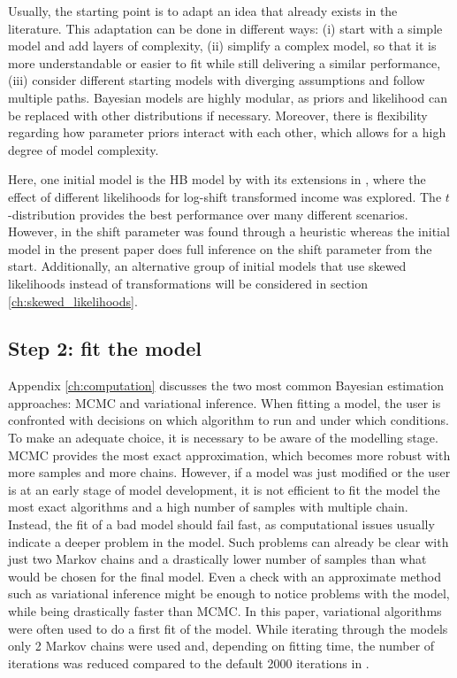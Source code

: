 Usually, the starting point is to adapt an idea that already exists in the literature.
This adaptation can be done in different ways: (i) start with a simple model and add layers of complexity, (ii) simplify a complex model, so that it is more understandable or easier to fit while still delivering a similar performance, (iii) consider different starting models with diverging assumptions and follow multiple paths.
Bayesian models are highly modular, as priors and likelihood can be replaced with other distributions if necessary.
Moreover, there is flexibility regarding how parameter priors interact with each other, which allows for a high degree of model complexity.


Here, one initial model is the HB model by \cite{molina_small_2014} with its extensions in \cite{morelli_hierarchical_2021}, where the effect of different likelihoods for log-shift transformed income was explored.
The $t$-distribution provides the best performance over many different scenarios.
However, in \cite{morelli_hierarchical_2021} the shift parameter was found through a heuristic whereas
the initial model in the present paper does full inference on the shift parameter from the start.
Additionally, an alternative group of initial models that use skewed likelihoods instead of transformations will be considered in section \ref{ch:skewed_likelihoods}.


\subsection{Step 2: fit the model}

Appendix \ref{ch:computation} discusses the two most common Bayesian estimation approaches: MCMC and variational inference.
When fitting a model, the user is confronted with decisions on which algorithm to run and under which conditions.
To make an adequate choice, it is necessary to be aware of the modelling stage.
MCMC provides the most exact approximation, which becomes more robust with more samples and more chains.
However, if a model was just modified or the user is at an early stage of model development, it is not efficient to fit the model the most exact algorithms and a high number of samples with multiple chain.
Instead, the fit of a bad model should fail fast, as computational issues usually indicate a deeper problem in the model.
Such problems can already be clear with just two Markov chains and a drastically lower number of samples than what would be chosen for the final model.
Even a check with an approximate method such as variational inference might be enough to notice problems with the model, while being drastically faster than MCMC.
In this paper, variational algorithms were often used to do a first fit of the model.
While iterating through the models only 2 Markov chains were used and, depending on fitting time, the number of iterations was reduced compared to the default 2000 iterations in .



